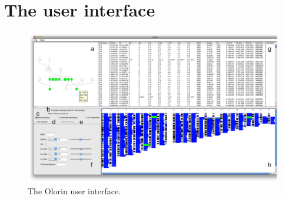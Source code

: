 \documentclass{article}
\begin{document}
\section{The user interface}
\begin{figure}[H]
	\centering
		\includegraphics[scale=0.5]{olorin_main}
	\caption{The Olorin user interface.}
	\label{main}
\end{figure}
\end{document}
